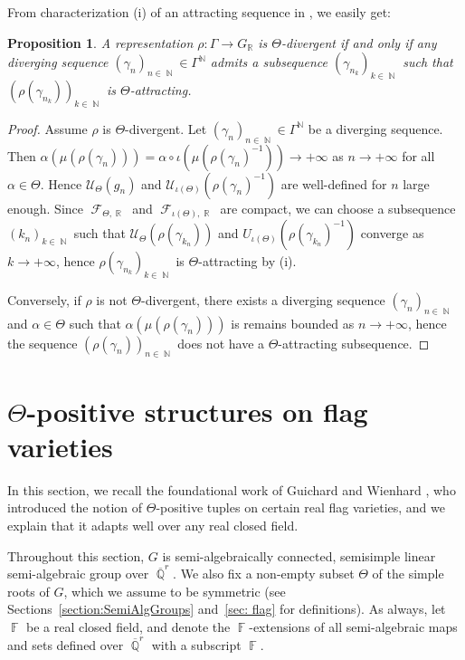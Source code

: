\documentclass{amsart}
\theoremstyle{plain}
\newtheorem{proposition}{Proposition}[section]
\theoremstyle{definition}
\DeclareMathOperator{\Fc}{\mathcal{F}}
\DeclareMathOperator{\Fb}{{\mathbb{F}}}
\DeclareMathOperator{\Nb}{{\mathbb{N}}}
\DeclareMathOperator{\Rb}{{\mathbb{R}}}
\DeclareMathOperator{\Qb}{\mathbb{Q}}
\newcommand{\1}{\mathbf{1}}
\begin{document}
From characterization (i) of an attracting sequence in , we easily get:

\begin{proposition}\label{prop: dynamics divergent sequence}
    A representation $\rho: \Gamma \to G_{\Rb}$ is $\Theta$-divergent if and only if any diverging sequence $(\gamma_n)_{n\in \Nb} \in \Gamma^{\Nb}$ admits a subsequence $(\gamma_{n_k})_{k\in \Nb}$ such that $(\rho(\gamma_{n_k}))_{k\in \Nb}$ is $\Theta$-attracting.
\end{proposition}

\begin{proof}
Assume $\rho$ is $\Theta$-divergent. Let $(\gamma_n)_{n\in \Nb} \in \Gamma^{\Nb}$ be a diverging sequence. Then $\alpha(\mu(\rho(\gamma_n))) = \alpha\circ \iota(\mu(\rho(\gamma_n)^{-1})) \to +\infty$ as $n\to +\infty$ for all $\alpha \in \Theta$. Hence $\mathcal U_\Theta(g_n)$ and $\mathcal U_{\iota(\Theta)}(\rho(\gamma_n)^{-1})$ are well-defined for $n$ large enough. Since $\Fc_{\Theta,\Rb}$ and $\Fc_{\iota(\Theta),\Rb}$ are compact, we can choose a subsequence $(k_n)_{k\in \Nb}$ such that $\mathcal U_\Theta(\rho(\gamma_{k_n}))$ and $U_{\iota(\Theta)}(\rho(\gamma_{k_n})^{-1})$ converge as $k\to +\infty$, hence $\rho(\gamma_{n_k})_{k\in \Nb}$ is $\Theta$-attracting by (i).

Conversely, if $\rho$ is not $\Theta$-divergent, there exists a diverging sequence $(\gamma_n)_{n\in \Nb}$ and $\alpha \in \Theta$ such that $\alpha(\mu(\rho(\gamma_n)))$ is remains bounded as $n\to+\infty$, hence the sequence $(\rho(\gamma_n))_{n\in \Nb}$ does not have a $\Theta$-attracting subsequence.
\end{proof}


\section{%
\texorpdfstring{%
$\Theta$-positive structures on flag varieties}%
{Theta-positive structures on flag varieties}}
\label{s: Positivity on flag varieties}

In this section, we recall the foundational work of Guichard and Wienhard \cite{guichard2025generalizing}, who introduced the notion of $\Theta$-positive tuples on certain real flag varieties, and we explain that it adapts well over any real closed field.

Throughout this section, $G$ is semi-algebraically connected, semisimple linear semi-algebraic group over $\overline{\Qb}^r$.
We also fix a non-empty subset $\Theta$ of the simple roots of $G$, which we assume to be symmetric (see Sections~\ref{section:SemiAlgGroups} and~\ref{sec: flag} for definitions). 
As always, let $\Fb$ be a real closed field, and denote the $\Fb$-extensions of all semi-algebraic maps and sets defined over $\overline{\Qb}^r$ with a subscript $\Fb$.
\end{document}
